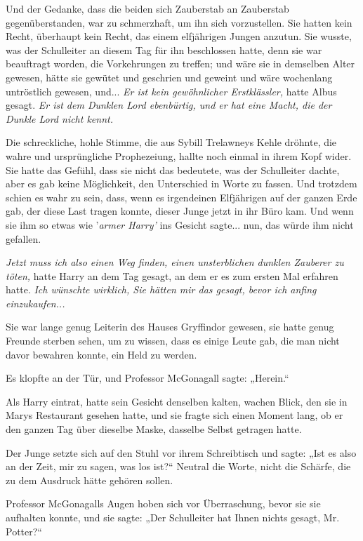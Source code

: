 {Und der Gedanke, dass die beiden sich Zauberstab an Zauberstab gegenüberstanden, war zu schmerzhaft, um ihn sich vorzustellen. Sie hatten kein Recht, überhaupt kein Recht, das einem elfjährigen Jungen anzutun. Sie wusste, was der Schulleiter an diesem Tag für ihn beschlossen hatte, denn sie war beauftragt worden, die Vorkehrungen zu treffen; und wäre sie in demselben Alter gewesen, hätte sie gewütet und geschrien und geweint und wäre wochenlang untröstlich gewesen, und... \emph{Er ist kein gewöhnlicher Erstklässler,} hatte Albus gesagt. \emph{Er ist dem Dunklen Lord ebenbürtig, und er hat eine Macht, die der Dunkle Lord nicht kennt.}

Die schreckliche, hohle Stimme, die aus Sybill Trelawneys Kehle dröhnte, die wahre und ursprüngliche Prophezeiung, hallte noch einmal in ihrem Kopf wider. Sie hatte das Gefühl, dass sie nicht das bedeutete, was der Schulleiter dachte, aber es gab keine Möglichkeit, den Unterschied in Worte zu fassen. Und trotzdem schien es wahr zu sein, dass, wenn es irgendeinen Elfjährigen auf der ganzen Erde gab, der diese Last tragen konnte, dieser Junge jetzt in ihr Büro kam. Und wenn sie ihm so etwas wie '\emph{armer Harry'} ins Gesicht sagte... nun, das würde ihm nicht gefallen.

\emph{Jetzt muss ich also einen Weg finden, einen unsterblichen dunklen Zauberer zu töten,} hatte Harry an dem Tag gesagt, an dem er es zum ersten Mal erfahren hatte. \emph{Ich wünschte wirklich, Sie hätten mir das gesagt, bevor ich anfing einzukaufen...}

Sie war lange genug Leiterin des Hauses Gryffindor gewesen, sie hatte genug Freunde sterben sehen, um zu wissen, dass es einige Leute gab, die man nicht davor bewahren konnte, ein Held zu werden.

Es klopfte an der Tür, und Professor McGonagall sagte: „Herein.“

Als Harry eintrat, hatte sein Gesicht denselben kalten, wachen Blick, den sie in Marys Restaurant gesehen hatte, und sie fragte sich einen Moment lang, ob er den ganzen Tag über dieselbe Maske, dasselbe Selbst getragen hatte.

Der Junge setzte sich auf den Stuhl vor ihrem Schreibtisch und sagte: „Ist es also an der Zeit, mir zu sagen, was los ist?“ Neutral die Worte, nicht die Schärfe, die zu dem Ausdruck hätte gehören sollen.

Professor McGonagalls Augen hoben sich vor Überraschung, bevor sie sie aufhalten konnte, und sie sagte: „Der Schulleiter hat Ihnen nichts gesagt, Mr. Potter?“

}
